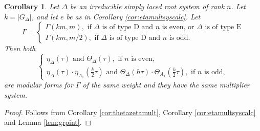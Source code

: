 \documentclass{article}
\newtheorem{corollary}[theorem]{Corollary}
\theoremstyle{definition}
\begin{document}
\begin{corollary} Let $\Delta$ be an irreducible simply laced root system of rank $n$. Let $k=|G_{\Delta}|$, and let $e$ be as in Corollary \ref{cor:etamultsyscalc}. 
	Let \[\Gamma=\begin{cases}
	\Gamma(km,m), \textrm{ if } \Delta \textrm{ is of type D and } n \textrm{ is even, or } \Delta \textrm{ is of type E} \\
	\Gamma(km,m/2), \textrm{ if } \Delta \textrm{ is of type D and } n \textrm{ is odd}.
	\end{cases}\]
	Then both
	\[
	\begin{cases}
	\eta_{\Delta}(\tau) \textrm{ and }\Theta_{\Delta}(\tau), \textrm{ if } n \textrm{ is even}, \\
	\eta_{\Delta}(\tau) \cdot \eta_{A_1}(\frac{k}{2}\tau) \textrm{ and }\Theta_{\Delta}(h\tau) \cdot \Theta_{A_1}(\frac{k}{2}\tau), \textrm{ if } n \textrm{ is odd},
	\end{cases}
	\]
	are modular forms for $\Gamma$ of the same weight and they have the same multiplier system.
	\label{cor:etathetamod}
\end{corollary}
\begin{proof}
	Follows from Corollary \ref{cor:thetazetamult}, Corollary \ref{cor:etamultsyscalc} and Lemma \ref{lem:grpint}.
\end{proof}



\end{document}
